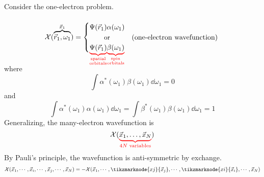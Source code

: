 \documentclass[12pt,a4paper,titlepage]{article}
\newcommand{\trm}[1]{\textrm{#1}} %
\newcommand{\Chi}{\mathcal{X}} %
\begin{document}
Consider the one-electron problem.
\begin{equation}
\Chi(\overbrace{\vec{r}_{1},\omega_{1}}^{\vec{x}_{1}})=\begin{cases}
\Psi(\vec{r}_{1})\alpha(\omega_{1})&\\
\hfil\small\trm{or}&(\trm{one-electron wavefunction})\\
\vphantom{\Psi(\vec{r}_{1})\beta(\omega_{1})}
\smash{\color{red}\underbrace{\color{black}\Psi(\vec{r}_{1})}_{\footnotesize\substack{\trm{spatial}\\\trm{orbitals}}}}\smash{\color{red}\underbrace{\color{black}\beta(\omega_{1})}_{\footnotesize\substack{\trm{spin}\\\trm{orbitals}}}}&
\end{cases}
\vphantom{\begin{cases}
\Psi(\vec{r}_{1})\alpha(\omega_{1})&\\
\hfil\small\trm{or}&(\trm{one-electron wavefunction})\\
\vphantom{\Psi(\vec{r}_{1})\beta(\omega_{1})}
\color{red}\underbrace{\Psi(\vec{r}_{1})}_{\footnotesize\substack{\trm{spatial}\\\trm{orbitals}}}\underbrace{\beta(\omega_{1})}_{\footnotesize\substack{\trm{spin}\\\trm{orbitals}}}&
\end{cases}}
\end{equation}
where
\begin{equation}
\int\alpha^{*}(\omega_{1})\beta(\omega_{1})\dd{\omega_{1}}=0
\end{equation}
and
\begin{equation}
\int\alpha^{*}(\omega_{1})\alpha(\omega_{1})\dd{\omega_{1}}=\int\beta^{*}(\omega_{1})\beta(\omega_{1})\dd{\omega_{1}}=1
\end{equation}
Generalizing, the many-electron wavefunction is
\begin{equation}
\Chi(\color{red}\underbrace{\color{black}\vec{x}_{1},\ldots,\vec{x}_{N}}_{4N\trm{ variables}}\color{black})
\end{equation}
By Pauli's principle, the wavefunction is anti-symmetric by exchange.
\begin{equation}
\Chi(\vec{x}_{1},\cdots,\vec{x}_{i},\cdots,\vec{x}_{j},\cdots,\vec{x}_{N})=-\Chi(\vec{x}_{1},\cdots,\tikzmarknode{xj}{\vec{x}_{j}},\cdots,\tikzmarknode{xi}{\vec{x}_{i}},\cdots,\vec{x}_{N})
\end{equation}
\end{document}
